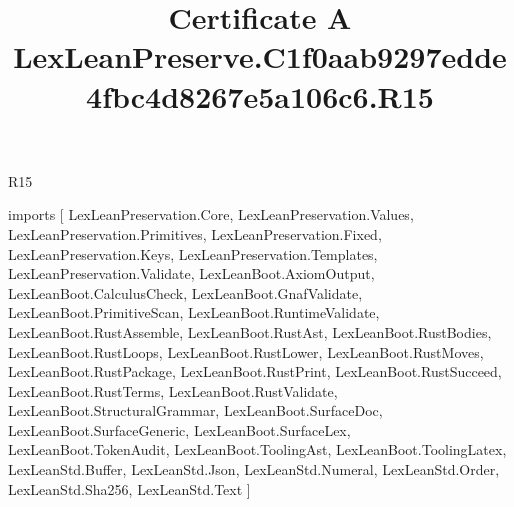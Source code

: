 \begin{lexlean}{R15}
\title{Certificate A LexLeanPreserve.C1f0aab9297edde4fbc4d8267e5a106c6.R15}
\begin{coremodule}
imports [
  LexLeanPreservation.Core,
  LexLeanPreservation.Values,
  LexLeanPreservation.Primitives,
  LexLeanPreservation.Fixed,
  LexLeanPreservation.Keys,
  LexLeanPreservation.Templates,
  LexLeanPreservation.Validate,
  LexLeanBoot.AxiomOutput,
  LexLeanBoot.CalculusCheck,
  LexLeanBoot.GnafValidate,
  LexLeanBoot.PrimitiveScan,
  LexLeanBoot.RuntimeValidate,
  LexLeanBoot.RustAssemble,
  LexLeanBoot.RustAst,
  LexLeanBoot.RustBodies,
  LexLeanBoot.RustLoops,
  LexLeanBoot.RustLower,
  LexLeanBoot.RustMoves,
  LexLeanBoot.RustPackage,
  LexLeanBoot.RustPrint,
  LexLeanBoot.RustSucceed,
  LexLeanBoot.RustTerms,
  LexLeanBoot.RustValidate,
  LexLeanBoot.StructuralGrammar,
  LexLeanBoot.SurfaceDoc,
  LexLeanBoot.SurfaceGeneric,
  LexLeanBoot.SurfaceLex,
  LexLeanBoot.TokenAudit,
  LexLeanBoot.ToolingAst,
  LexLeanBoot.ToolingLatex,
  LexLeanStd.Buffer,
  LexLeanStd.Json,
  LexLeanStd.Numeral,
  LexLeanStd.Order,
  LexLeanStd.Sha256,
  LexLeanStd.Text
]


\end{coremodule}
\end{lexlean}
